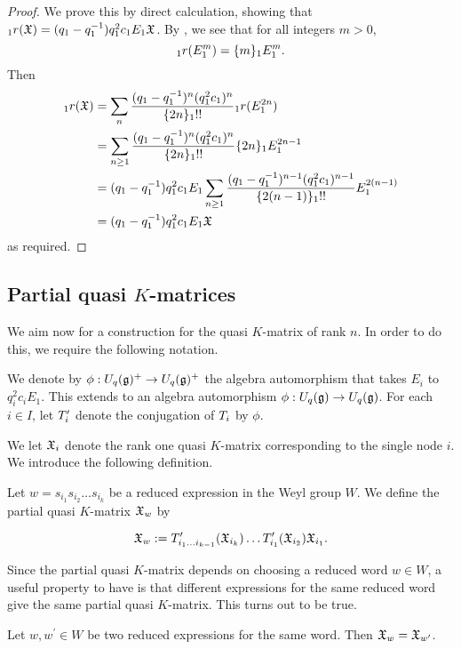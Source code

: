 \documentclass[a4 paper, 10pt]{article}
\begin{document}
\begin{proof}
	We prove this by direct calculation, showing that ${}_{1}r(\mathfrak{X}) = (q_1 - q_1^{-1})q_1^2c_1 E_1 \mathfrak{X}$.
	By \cite[8.26]{b-Jantzen96}, we see that for all integers $m>0$, 
		\begin{equation} \label{eq: 1rE1}
			{}_{1}r(E_1^m) = \{ m \}_1 E_1^m.
		\end{equation}
	Then
		\begin{align*}
			{}_{1}r(\mathfrak{X}) 	&= \sum_{n} \dfrac{(q_1 - q_1^{-1})^n(q_1^2c_1)^n}{ \{2n\}_{1}!! } {}_{1}r(E_1^{2n}) \\
							&= \sum_{n \geq 1} \dfrac{(q_1 - q_1^{-1})^n(q_1^2c_1)^n}{ \{2n\}_{1}!! } \{2n\}_1E_1^{2n-1} \\
							&= (q_1 - q_1^{-1})q_1^2c_1E_1 \sum_{n \geq 1} \dfrac{(q_1 - q_1^{-1})^{n-1}(q_1^2c_1)^{n-1}}{ \{2(n-1)\}_{1}!! }E_1^{2(n-1)} \\
							&= (q_1 - q_1^{-1})q_1^2c_1E_1 \mathfrak{X}
		\end{align*}				
	as required.
\end{proof}

\subsection{Partial quasi $K$-matrices}

We aim now for a construction for the quasi $K$-matrix of rank $n$. In order to do this, we require the following notation.

We denote by $\phi: U_q(\mathfrak{g})^+ \rightarrow U_q(\mathfrak{g})^+$ the algebra automorphism that takes $E_i$ to $q_i^2c_iE_1$. This extends to an algebra automorphism $\phi: U_q(\mathfrak{g}) \rightarrow U_q(\mathfrak{g})$. For each $i \in I$, let $T^{\prime}_{i}$ denote the conjugation of $T_{i}$ by $\phi$.

We let $\mathfrak{X}_{i}$ denote the rank one quasi $K$-matrix corresponding to the single node $i$. We introduce the following definition.


\begin{definition} \label{PartialK}
	Let $w = s_{i_1}s_{i_2} \dots s_{i_k}$ be a reduced expression in the Weyl group $W$. We define the partial quasi $K$-matrix $\mathfrak{X}_{w}$ by
	
	\begin{equation} \label{eq:PartialK}
		\mathfrak{X}_{w} := T^{\prime}_{i_1 \dots i_{k-1}}(\mathfrak{X}_{i_k}) \dots T^{\prime}_{i_1}(\mathfrak{X}_{i_2})\mathfrak{X}_{i_1}.
	\end{equation}
\end{definition}

Since the partial quasi $K$-matrix depends on choosing a reduced word $w \in W$, a useful property to have is that different expressions for the same reduced word give the same partial quasi $K$-matrix. This turns out to be true. 
\begin{theorem} \label{Qkmind}
	Let $w, w^{\prime} \in W$ be two reduced expressions for the same word. Then $\mathfrak{X}_{w} = \mathfrak{X}_{w^{\prime}}$. 
\end{theorem}
\end{document}
